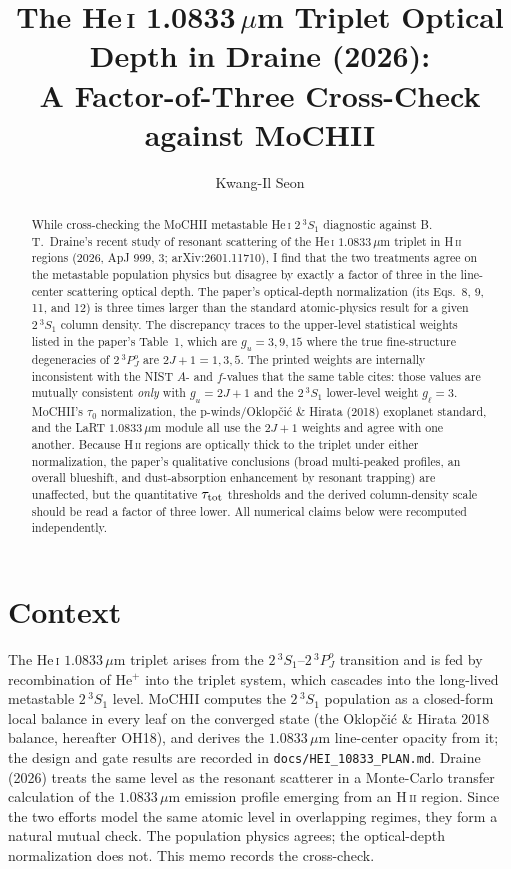 \documentclass[english,a4paper]{my_memo}
\newcommand{\code}[1]{\texttt{#1}}
\newcommand{\HeI}{He\,\textsc{i}}
\newcommand{\HII}{H\,\textsc{ii}}
\newcommand{\tSSS}{2\,^3\!S_1}
\newcommand{\tPPP}{2\,^3\!P^o_J}
\newcommand{\tautot}{\tau_{\rm tot}}
\newcommand{\gl}{g_\ell}
\begin{document}
\title{The He\,\textsc{i} 1.0833\,$\mu$m Triplet Optical Depth in Draine (2026):\\
A Factor-of-Three Cross-Check against MoCHII}
\author{Kwang-Il Seon}
\date{\docmoddate}
\maketitle

\begin{abstract}
While cross-checking the MoCHII metastable \HeI{} $\tSSS$ diagnostic
against B.\,T.\ Draine's recent study of resonant scattering of the
\HeI{} $1.0833\,\mu$m triplet in \HII{} regions (2026, ApJ 999, 3;
arXiv:2601.11710), I find that the two treatments agree on the
metastable population physics but disagree by exactly a factor of three
in the line-center scattering optical depth.  The paper's optical-depth
normalization (its Eqs.~8, 9, 11, and 12) is three times larger than the
standard atomic-physics result for a given $\tSSS$ column density.  The
discrepancy traces to the upper-level statistical weights listed in the
paper's Table~1, which are $g_u = 3, 9, 15$ where the true fine-structure
degeneracies of $\tPPP$ are $2J+1 = 1, 3, 5$.  The printed weights are
internally inconsistent with the NIST $A$- and $f$-values that the same
table cites: those values are mutually consistent \emph{only} with
$g_u = 2J+1$ and the $\tSSS$ lower-level weight $\gl = 3$.  MoCHII's
$\tau_0$ normalization, the p-winds/Oklop\v{c}i\'c \& Hirata (2018)
exoplanet standard, and the LaRT $1.0833\,\mu$m module all use the
$2J+1$ weights and agree with one another.  Because \HII{} regions are
optically thick to the triplet under either normalization, the paper's
qualitative conclusions (broad multi-peaked profiles, an overall
blueshift, and dust-absorption enhancement by resonant trapping) are
unaffected, but the quantitative $\tautot$ thresholds and the derived
column-density scale should be read a factor of three lower.  All
numerical claims below were recomputed independently.
\end{abstract}

\section{Context}
The \HeI{} $1.0833\,\mu$m triplet arises from the $\tSSS$--$\tPPP$
transition and is fed by recombination of He$^+$ into the triplet system,
which cascades into the long-lived metastable $\tSSS$ level.  MoCHII
computes the $\tSSS$ population as a closed-form local balance in every
leaf on the converged state (the Oklop\v{c}i\'c \& Hirata 2018 balance,
hereafter OH18), and derives the $1.0833\,\mu$m line-center opacity from
it; the design and gate results are recorded in
\code{docs/HEI\_10833\_PLAN.md}.  Draine (2026) treats the same level as
the resonant scatterer in a Monte-Carlo transfer calculation of the
$1.0833\,\mu$m emission profile emerging from an \HII{} region.  Since the
two efforts model the same atomic level in overlapping regimes, they form
a natural mutual check.  The population physics agrees; the optical-depth
normalization does not.  This memo records the cross-check.
\end{document}
